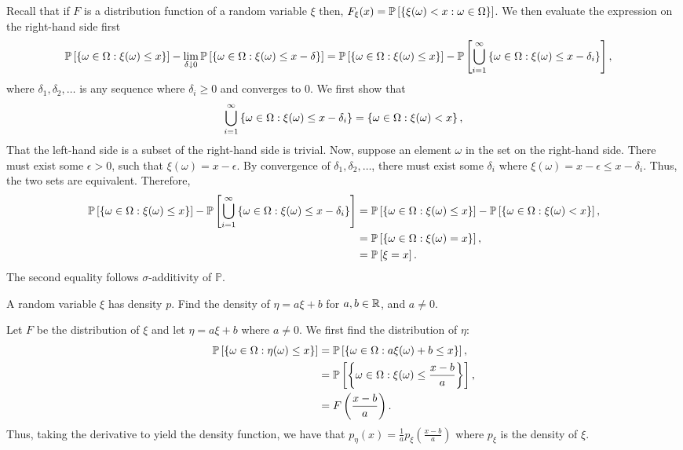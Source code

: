 \begin{solution}
    Recall that if $F$ is a distribution function of a random variable $\xi$
    then, $F_\xi(x) = \mathbb{P}\left[{\left\{ \xi(\omega) < x: \omega \in
    \Omega \right\}}\right]$. We then evaluate the expression on the right-hand side
    first 
    \begin{align*}
        \mathbb{P}\left[{\left\{ \omega \in \Omega: \xi(\omega) \leq x \right\}}\right] - \lim_{\delta \downarrow 0} \mathbb{P}\left[{\left\{ \omega \in \Omega: \xi(\omega) \leq x-\delta \right\}}\right] &= \mathbb{P}\left[{\left\{ \omega \in \Omega: \xi(\omega) \leq x \right\}}\right] - \mathbb{P}\left[{\bigcup_{i=1}^\infty \left\{ \omega \in \Omega: \xi(\omega) \leq x - \delta_i \right\}}\right],
    \end{align*}
    where $\delta_1, \delta_2, \ldots$ is any sequence where $\delta_i \geq 0$
    and converges to 0. We first show that \[\bigcup_{i=1}^\infty \left\{ \omega
    \in \Omega: \xi(\omega) \leq x - \delta_i \right\} = \left\{ \omega \in \Omega:
    \xi(\omega) < x \right\},\] That the left-hand side is a subset of the right-hand
    side is trivial. Now, suppose an element $\omega$ in the set on the
    right-hand side. There must exist some $\epsilon > 0$, such that
    $\xi(\omega) = x - \epsilon$. By convergence of $\delta_1,\delta_2,\ldots$,
    there must exist some $\delta_i$ where $\xi(\omega) = x - \epsilon \leq x -
    \delta_i$. Thus, the two sets are equivalent. Therefore, 
    \begin{align*}
        \mathbb{P}\left[{\left\{ \omega \in \Omega: \xi(\omega) \leq x \right\}}\right] - \mathbb{P}\left[{\bigcup_{i=1}^\infty \left\{ \omega \in \Omega: \xi(\omega) \leq x - \delta_i \right\}}\right] &= \mathbb{P}\left[{\left\{ \omega \in \Omega: \xi(\omega) \leq x \right\}}\right] - \mathbb{P}\left[{\left\{ \omega \in \Omega: \xi(\omega) < x \right\}}\right], \\
        &= \mathbb{P}\left[{\left\{ \omega \in \Omega: \xi(\omega) = x \right\}}\right], \\
        &= \mathbb{P}\left[{\xi = x}\right].
    \end{align*}
    The second equality follows $\sigma$-additivity of $\mathbb{P}$.
\end{solution}
\begin{problem}{10}
    A random variable $\xi$ has density $p$. Find the density of $\eta = a\xi + b$ for $a, b \in \mathbb{R}$, and $a \neq 0$.
\end{problem}
\begin{solution}
    Let $F$ be the distribution of $\xi$ and let $\eta = a\xi + b$ where $a\neq
    0$. We first find the distribution of $\eta$:
    \begin{align*}
        \mathbb{P}\left[{\left\{ \omega \in \Omega: \eta(\omega) \leq x \right\}}\right] &= \mathbb{P}\left[{\left\{ \omega \in \Omega: a\xi(\omega) + b \leq x \right\}}\right], \\
        &= \mathbb{P}\left[{\left\{ \omega\in\Omega:\xi(\omega) \leq \frac{x-b}{a} \right\}}\right], \\
        &= F\left(\frac{x-b}{a}\right).
    \end{align*}
    Thus, taking the derivative to yield the density function, we have that
    $p_\eta(x) = \frac{1}{a}p_\xi\left(\frac{x-b}{a}\right)$ where $p_\xi$ is
    the density of $\xi$. 
\end{solution}
